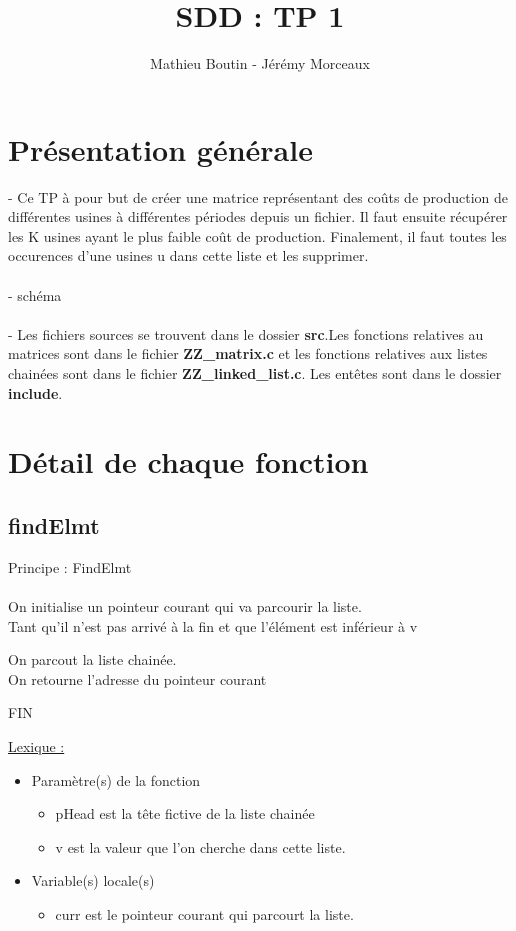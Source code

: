 \documentclass[a4paper]{article}
\title{SDD : TP 1}
\author{Mathieu Boutin - Jérémy Morceaux}
\newcommand\tab[1][1cm]{\hspace*{#1}}
\begin{document}
\maketitle
\section{Présentation générale}
- Ce TP à pour but de créer une matrice représentant des coûts de production de différentes usines à différentes périodes depuis un fichier. Il faut ensuite récupérer les K usines ayant le plus faible coût de production. Finalement, il faut toutes les occurences d'une usines u dans cette liste et les supprimer.
\\
\\
- schéma 
\\
\\
- Les fichiers sources se trouvent dans le dossier \textbf{src}.Les fonctions relatives au matrices sont dans le fichier \textbf{ZZ\_matrix.c} et les fonctions relatives aux listes chainées sont dans le fichier \textbf{ZZ\_linked\_list.c}. Les entêtes sont dans le dossier \textbf{include}.

\section{Détail de chaque fonction}
\subsection{findElmt}
\begin{algorithm}
Principe : FindElmt
\\
\\
\tab On initialise un pointeur courant qui va parcourir la liste. 
\\
\tab Tant qu'il n'est pas arrivé à la fin et que l'élément est inférieur à v 

\tab \tab On parcout la liste chainée.
\\
\tab On retourne l'adresse du pointeur courant 

FIN
\end{algorithm}
\underline{Lexique :}
\begin{itemize}
\item Paramètre(s) de la fonction  
\begin{itemize}
\item pHead est la tête fictive de la liste chainée
\item v est la valeur que l'on cherche dans cette liste.
\end{itemize}
\item Variable(s) locale(s)
\begin{itemize}
\item curr est le pointeur courant qui parcourt la liste.
\end{itemize}
\end{itemize}
\end{document}
